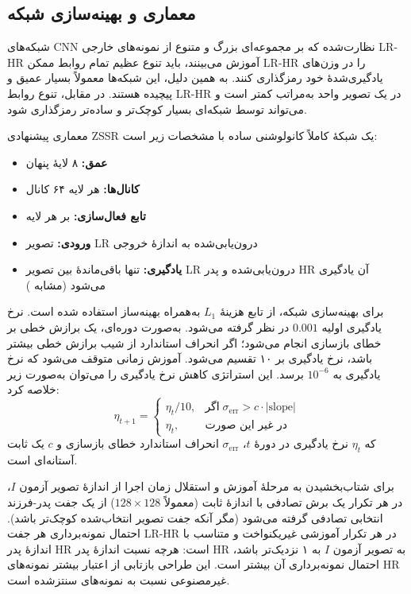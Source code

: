 \subsection{معماری و بهینه‌سازی شبکه}
\label{subsec:arch_optim}

شبکه‌های CNN نظارت‌شده که بر مجموعه‌ای بزرگ و متنوع از نمونه‌های
خارجی LR-HR آموزش می‌بینند، باید تنوع عظیم تمام روابط ممکن LR-HR
را در وزن‌های یادگیری‌شدهٔ خود رمزگذاری کنند. به همین دلیل، این
شبکه‌ها معمولاً بسیار عمیق و پیچیده هستند. در مقابل، تنوع روابط
LR-HR در یک تصویر واحد به‌مراتب کمتر است و می‌تواند توسط شبکه‌ای
بسیار کوچک‌تر و ساده‌تر رمزگذاری شود.

معماری پیشنهادی ZSSR یک شبکهٔ کاملاً کانولوشنی ساده با مشخصات زیر است:

\begin{itemize}
\item \textbf{عمق:} ۸ لایهٔ پنهان
\item \textbf{کانال‌ها:} هر لایه ۶۴ کانال
\item \textbf{تابع فعال‌سازی:}  بر هر لایه
\item \textbf{ورودی:} تصویر LR درون‌یابی‌شده به اندازهٔ خروجی
\item \textbf{یادگیری:} تنها باقی‌ماندهٔ بین
تصویر LR درون‌یابی‌شده و پدر HR آن یادگیری می‌شود (مشابه
\cite{dong2014srcnn, kim2016vdsr})
\end{itemize}

برای بهینه‌سازی شبکه، از تابع هزینهٔ $L_1$ به‌همراه بهینه‌ساز
 \cite{kingma2014adam} استفاده شده است. نرخ یادگیری اولیه
$0.001$ در نظر گرفته می‌شود. به‌صورت دوره‌ای، یک برازش خطی بر خطای
بازسازی انجام می‌شود؛ اگر انحراف استاندارد از شیب برازش خطی بیشتر
باشد، نرخ یادگیری بر ۱۰ تقسیم می‌شود. آموزش زمانی متوقف می‌شود که
نرخ یادگیری به $10^{-6}$ برسد. این استراتژی کاهش نرخ یادگیری را
می‌توان به‌صورت زیر خلاصه کرد:
\begin{equation}
\label{eq:lr_schedule}
\eta_{t+1} =
\begin{cases}
\eta_t / 10, & \text{اگر}\; \sigma_{\text{err}} > c \cdot |\text{slope}| \\
\eta_t, & \text{در غیر این صورت}
\end{cases}
\end{equation}
که $\eta_t$ نرخ یادگیری در دورهٔ $t$، $\sigma_{\text{err}}$ انحراف
استاندارد خطای بازسازی و $c$ یک ثابت آستانه‌ای است.

برای شتاب‌بخشیدن به مرحلهٔ آموزش و استقلال زمان اجرا از اندازهٔ
تصویر آزمون $I$، در هر تکرار یک برش تصادفی با اندازهٔ ثابت (معمولاً
$128 \times 128$) از یک جفت پدر-فرزند انتخابی تصادفی گرفته می‌شود
(مگر آنکه جفت تصویر انتخاب‌شده کوچک‌تر باشد). احتمال نمونه‌برداری
هر جفت LR-HR در هر تکرار آموزشی غیریکنواخت و متناسب با اندازهٔ
پدر HR است: هرچه نسبت اندازهٔ پدر HR به تصویر آزمون $I$ به ۱
نزدیک‌تر باشد، احتمال نمونه‌برداری آن بیشتر است. این طراحی بازتابی
از اعتبار بیشتر نمونه‌های HR غیرمصنوعی نسبت به نمونه‌های سنتز‌شده
است.

